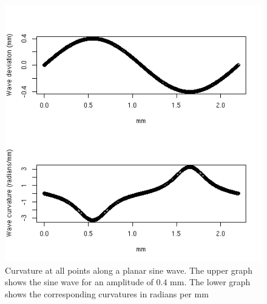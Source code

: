 %

\begin{figure}[!h]
  \centering
  \includegraphics[width=1.0\textwidth]{figsincurv.png}
  \caption{Curvature at all points along a planar sine wave. The upper graph shows the sine wave for an amplitude of $0.4$ mm. The lower graph shows the corresponding curvatures in radians per mm}
  \label{fig:sincurv}
\end{figure}

%

